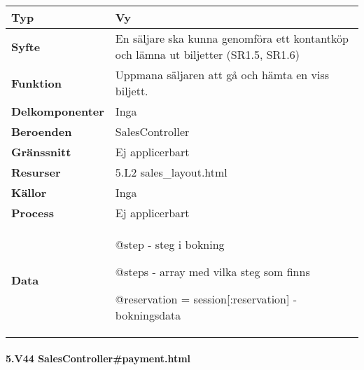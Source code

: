 \documentclass[a4paper, twoside, 11pt, titlepage]{article}
\begin{document}
			\begin {table} [ht] \begin{tabular} {  p{3.5cm} p{11.6cm} }
				\hline
				{\sffamily\textbf{Typ}} & {Vy} \\
				\hline
				{\sffamily\textbf{Syfte}} & {En säljare ska kunna genomföra ett kontantköp och lämna ut biljetter (SR1.5, SR1.6)} \\
				\hline
				{\sffamily\textbf{Funktion}} & {Uppmana säljaren att gå och hämta en viss biljett.} \\
				\hline
				{\sffamily\textbf{Delkomponenter}} & {Inga} \\
				\hline
				{\sffamily\textbf{Beroenden}} & {SalesController} \\
				\hline
				{\sffamily\textbf{Gränssnitt}} & {Ej applicerbart} \\
				\hline
				{\sffamily\textbf{Resurser}} & {5.L2 sales\_layout.html} \\
				\hline
				{\sffamily\textbf{Källor}} & {Inga} \\
				\hline
				{\sffamily\textbf{Process}} & {Ej applicerbart} \\
				\hline
				{\sffamily\textbf{Data}} & {@step - steg i bokning

@steps - array med vilka steg som finns

@reservation = session[:reservation] - bokningsdata} \\
				\hline
			\end{tabular} \end{table} \FloatBarrier


			\clearpage %
			\paragraph{5.V44 SalesController\#payment.html}\
\end{document}
